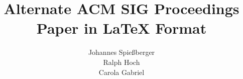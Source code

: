 \documentclass{sig-alternate}
\begin{document}
%

\title{Alternate {\ttlit ACM} SIG Proceedings Paper in LaTeX
Format}
%
%
%
%
%

%
\author{
%
%
\alignauthor
Johannes Spie{\ss}berger\\
\alignauthor
Ralph Hoch\\
\alignauthor 
Carola Gabriel\\
}
\end{document}
